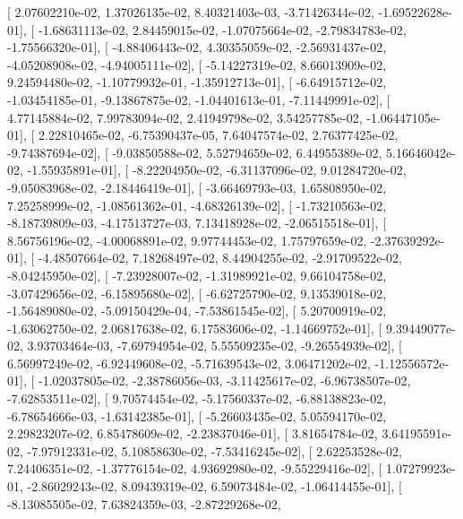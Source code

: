 \documentclass{article}
\begin{document}
       [  2.07602210e-02,   1.37026135e-02,   8.40321403e-03,
         -3.71426344e-02,  -1.69522628e-01],
       [ -1.68631113e-02,   2.84459015e-02,  -1.07075664e-02,
         -2.79834783e-02,  -1.75566320e-01],
       [ -4.88406443e-02,   4.30355059e-02,  -2.56931437e-02,
         -4.05208908e-02,  -4.94005111e-02],
       [ -5.14227319e-02,   8.66013909e-02,   9.24594480e-02,
         -1.10779932e-01,  -1.35912713e-01],
       [ -6.64915712e-02,  -1.03454185e-01,  -9.13867875e-02,
         -1.04401613e-01,  -7.11449991e-02],
       [  4.77145884e-02,   7.99783094e-02,   2.41949798e-02,
          3.54257785e-02,  -1.06447105e-01],
       [  2.22810465e-02,  -6.75390437e-05,   7.64047574e-02,
          2.76377425e-02,  -9.74387694e-02],
       [ -9.03850588e-02,   5.52794659e-02,   6.44955389e-02,
          5.16646042e-02,  -1.55935891e-01],
       [ -8.22204950e-02,  -6.31137096e-02,   9.01284720e-02,
         -9.05083968e-02,  -2.18446419e-01],
       [ -3.66469793e-03,   1.65808950e-02,   7.25258999e-02,
         -1.08561362e-01,  -4.68326139e-02],
       [ -1.73210563e-02,  -8.18739809e-03,  -4.17513727e-03,
          7.13418928e-02,  -2.06515518e-01],
       [  8.56756196e-02,  -4.00068891e-02,   9.97744453e-02,
          1.75797659e-02,  -2.37639292e-01],
       [ -4.48507664e-02,   7.18268497e-02,   8.44904255e-02,
         -2.91709522e-02,  -8.04245950e-02],
       [ -7.23928007e-02,  -1.31989921e-02,   9.66104758e-02,
         -3.07429656e-02,  -6.15895680e-02],
       [ -6.62725790e-02,   9.13539018e-02,  -1.56489080e-02,
         -5.09150429e-04,  -7.53861545e-02],
       [  5.20700919e-02,  -1.63062750e-02,   2.06817638e-02,
          6.17583606e-02,  -1.14669752e-01],
       [  9.39449077e-02,   3.93703464e-03,  -7.69794954e-02,
          5.55509235e-02,  -9.26554939e-02],
       [  6.56997249e-02,  -6.92449608e-02,  -5.71639543e-02,
          3.06471202e-02,  -1.12556572e-01],
       [ -1.02037805e-02,  -2.38786056e-03,  -3.11425617e-02,
         -6.96738507e-02,  -7.62853511e-02],
       [  9.70574454e-02,  -5.17560337e-02,  -6.88138823e-02,
         -6.78654666e-03,  -1.63142385e-01],
       [ -5.26603435e-02,   5.05594170e-02,   2.29823207e-02,
          6.85478609e-02,  -2.23837046e-01],
       [  3.81654784e-02,   3.64195591e-02,  -7.97912331e-02,
          5.10858630e-02,  -7.53416245e-02],
       [  2.62253528e-02,   7.24406351e-02,  -1.37776154e-02,
          4.93692980e-02,  -9.55229416e-02],
       [  1.07279923e-01,  -2.86029243e-02,   8.09439319e-02,
          6.59073484e-02,  -1.06414455e-01],
       [ -8.13085505e-02,   7.63824359e-03,  -2.87229268e-02,
\end{document}
